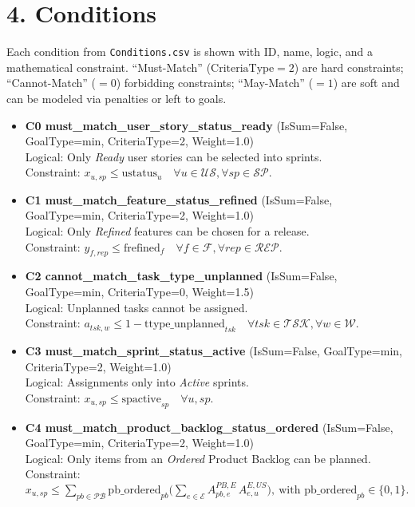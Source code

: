\documentclass[a4paper,11pt]{article}
\begin{document}
\section{4. Conditions}
Each condition from \texttt{Conditions.csv} is shown with ID, name, logic, and a mathematical constraint. “Must-Match” ($\text{CriteriaType}=2$) are hard constraints; “Cannot-Match” ($=0$) forbidding constraints; “May-Match” ($=1$) are soft and can be modeled via penalties or left to goals.

\begin{itemize}[leftmargin=2.2em]
  \item \textbf{C0 must\_match\_user\_story\_status\_ready} (IsSum=False, GoalType=min, CriteriaType=2, Weight=1.0)\\
  Logical: Only \emph{Ready} user stories can be selected into sprints.\\
  Constraint: $\displaystyle x_{u,sp} \le \text{ustatus}_{u}\quad \forall u\in\mathcal{US},\forall sp\in\mathcal{SP}$.
  \item \textbf{C1 must\_match\_feature\_status\_refined} (IsSum=False, GoalType=min, CriteriaType=2, Weight=1.0)\\
  Logical: Only \emph{Refined} features can be chosen for a release.\\
  Constraint: $\displaystyle y_{f,rep} \le \text{frefined}_{f}\quad \forall f\in\mathcal{F},\forall rep\in\mathcal{REP}$.
  \item \textbf{C2 cannot\_match\_task\_type\_unplanned} (IsSum=False, GoalType=min, CriteriaType=0, Weight=1.5)\\
  Logical: Unplanned tasks cannot be assigned.\\
  Constraint: $\displaystyle a_{tsk,w} \le 1-\text{ttype\_unplanned}_{tsk}\quad \forall tsk\in\mathcal{TSK},\forall w\in\mathcal{W}$.
  \item \textbf{C3 must\_match\_sprint\_status\_active} (IsSum=False, GoalType=min, CriteriaType=2, Weight=1.0)\\
  Logical: Assignments only into \emph{Active} sprints.\\
  Constraint: $\displaystyle x_{u,sp} \le \text{spactive}_{sp}\quad \forall u,sp$.
  \item \textbf{C4 must\_match\_product\_backlog\_status\_ordered} (IsSum=False, GoalType=min, CriteriaType=2, Weight=1.0)\\
  Logical: Only items from an \emph{Ordered} Product Backlog can be planned.\\
  Constraint: $\displaystyle x_{u,sp} \le \sum_{pb\in\mathcal{PB}} \text{pb\_ordered}_{pb}\Big(\sum_{e\in\mathcal{E}}A^{PB,E}_{pb,e}\,A^{E,US}_{e,u}\Big),\ \text{with }\text{pb\_ordered}_{pb}\in\{0,1\}.$

\end{itemize}
\end{document}
